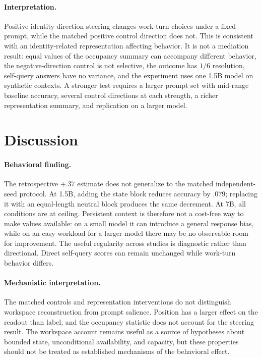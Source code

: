 \documentclass{article}
\begin{document}
\paragraph{Interpretation.} Positive identity-direction steering changes work-turn choices under a fixed prompt, while the matched positive control direction does not. This is consistent with an identity-related representation affecting behavior. It is not a mediation result: equal values of the occupancy summary can accompany different behavior, the negative-direction control is not selective, the outcome has $1/6$ resolution, self-query answers have no variance, and the experiment uses one 1.5B model on synthetic contexts. A stronger test requires a larger prompt set with mid-range baseline accuracy, several control directions at each strength, a richer representation summary, and replication on a larger model.

\section{Discussion}
\label{sec:discussion}
\paragraph{Behavioral finding.} The retrospective $+.37$ estimate does not generalize to the matched independent-seed protocol. At 1.5B, adding the state block reduces accuracy by $.079$; replacing it with an equal-length neutral block produces the same decrement. At 7B, all conditions are at ceiling. Persistent context is therefore not a cost-free way to make values available: on a small model it can introduce a general response bias, while on an easy workload for a larger model there may be no observable room for improvement. The useful regularity across studies is diagnostic rather than directional. Direct self-query scores can remain unchanged while work-turn behavior differs.

\paragraph{Mechanistic interpretation.} The matched controls and representation interventions do not distinguish workspace reconstruction from prompt salience. Position has a larger effect on the readout than label, and the occupancy statistic does not account for the steering result. The workspace account remains useful as a source of hypotheses about bounded state, unconditional availability, and capacity, but these properties should not be treated as established mechanisms of the behavioral effect.
\end{document}
